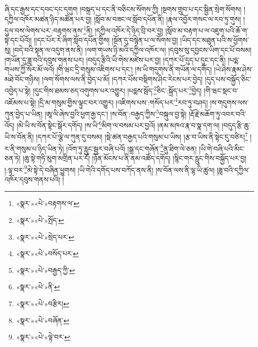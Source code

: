 ཞི་དང་རྒྱས་དང་དབང་དང་དགུག །བསྐྲད་པ་དང་ནི་བཅིངས་སོགས་ཀྱི། །སྔགས་གྲུབ་པ་དང་སྦྱིན་སྲེག་སོགས། །དཀྱིལ་འཁོར་མཚན་ཉིད་མཚོན་པར་བྱ། །སློབ་མ་བཟང་ལ་སློབ་དཔོན་ནི། །རྣལ་འབྱོར་གསང་ལ་རབ་ཏུ་གུས། །དུལ་བས་ལེགས་པར་:བརྟགས་ནས་\footnote{«སྣར་»«པེ་»བརྟགས་ལ་}ནི། །དཀྱིལ་འཁོར་དེ་ཉིད་བྲི་བར་བྱ། །སློབ་མ་བརྟག་པ་ལ་འཇུག་པའི་ཆོ་ག་སྟེ་དང་པོའོ།། །།དང་པོར་རེ་ཞིག་སློབ་དཔོན་གྱིས། །སྔོན་དུ་བསྙེན་པ་ལ་སོགས་བྱ། །ཡིད་དང་མཐུན་པའི་ས་ཕྱོགས་སུ། །བདེ་བའི་སྟན་ལ་འདུག་ནས་ནི། །ལག་གཡས་ཉི་མའི་དཀྱིལ་འཁོར་ལ། །དབུས་སུ་དབྱངས་ཡིག་དང་པོ་བསམ། །གཡོན་དུ་ཟླ་བའི་དབུས་གནས་པར། །བདུད་རྩིའི་ཡི་གེས་མཛེས་པར་བྱ། །དཀར་པོ་དུད་པ་དུང་དང་ནི། །པདྨ་གཡས་ཀྱི་སོར་མོ་ལའོ། །གི་ཝང་དྲི་གསུམ་འཇིགས་པ་དང་། །ས་ཡི་གདུགས་ནི་གཡོན་ལ་དགོད། །ཡེ་ཤེས་རྣམ་ཤེས་མཐེ་བོང་གཉིས། །ལག་སོགས་ལས་ནི་བྱེད་པ་མོ། །དཀར་པོས་བསྡིགས་ཤིང་རེངས་པར་བྱེད། །དུད་པས་བསྐྱོད་ཅིང་འབྱེད་པ་སྟེ། །དུང་གིས་ཐམས་ཅད་འགུགས་པར་འགྱུར། །པདྨས་སྦོད་\footnote{«སྣར་»«པེ་»སྤོད་}ཅིང་:སྐྲོད་པར་\footnote{«སྣར་»«པེ་»སྲེད་པར་}བྱེད། །གི་ཝང་སྡང་བ་འཇོམས་པ་སྟེ། །དྲི་མ་གསུམ་གྱིས་ལྟུང་བར་འགྱུར། །འཇིགས་པས་:གསོད་པར་\footnote{«སྣར་»«པེ་»བསོད་པར་}རབ་ཏུ་བཤད། །ས་གདུགས་ལས་ཀུན་བྱེད་པ་ཡིན། །ཨཱ་ལི་ཞེས་བྱའི་ཕྱག་རྒྱ་དང་། །ས་བོན་:བརྒྱད་ཀྱིས་\footnote{«སྣར་»«པེ་»བརྒྱད་ཀྱི་}བསྐུལ་བྱ་སྟེ། །རྡོ་རྗེ་མཆོག་ཏུ་འབར་བའི་འོད། །མེ་ཡི་ས་བོན་སྟེང་སྒོར་དགོད། །ས་ཡི་\footnote{«སྣར་»«པེ་»ནི་}མིག་ལ་བསམ་པར་བྱའོ། །ནམ་མཁའ་རྣ་བ་སྣ་དག་ལ། །བདུད་རྩི་ཆུ་ཡི་ས་བོན་ནི། །དཀར་པོ་ལྕེ་ལ་ཀུན་དུ་བསམ། །སྡེ་ཚན་བརྒྱད་པའི་གསུམ་པ་ཡིས། །རྩ་བ་ཡིས་ནི་སྟེང་དུ་བཙིར།\footnote{«སྣར་»«པེ་»བརྩིར།} །ར་ནི་གསུམ་པ་ཉིད་ཡིན་ཏེ། །འོག་ཏུ་རླུང་སྦྱར་བཞི་པའོ། །སྒྲ་དང་གཞོན་\footnote{«སྣར་»«པེ་»བཞོན་}ནུ་ཐིག་ལེ་ཅན། །ཡི་གེ་བཞི་པའི་མིང་ཅན་ཏེ། །ཆུ་སྟེ་གཏི་མུག་མགྲིན་པར་རོ། །ཉོན་མོངས་པ་ནི་ནམ་འཚོད་དགོད། །སྙིང་གར་རླུང་གིས་བསྐྱོད་པར་བྱ། །:ལྟ་བར་\footnote{«སྣར་»«པེ་»ལྟེ་བར་}མེ་སྟེ་དེ་བཞིན་ཕྱུགས། །ཡི་གེའི་དགོད་པས་བཀོད་ནས་ནི། །ས་བོན་ལས་ནི་ལྷ་ཡི་ཚུལ། །ཟླ་བའི་དཀྱིལ་འཁོར་དབུས་གནས་པའི། །

